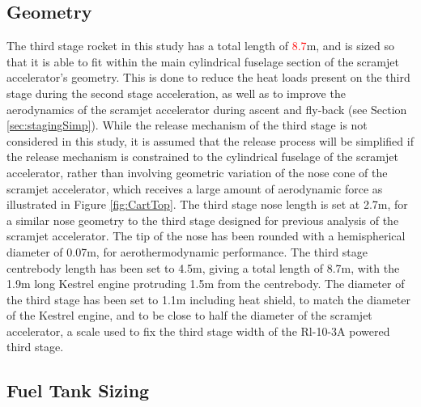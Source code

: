  \subsection{Geometry}\label{sec:3int}
The third stage rocket in this study has a total length of \textcolor{red}{8.7}m, and is sized so that it is able to fit within the main cylindrical fuselage section of the scramjet accelerator's geometry. This is done to reduce the heat loads present on the third stage during the second stage acceleration, as well as to improve the aerodynamics of the scramjet accelerator during ascent and fly-back (see Section \ref{sec:stagingSimp}). While the release mechanism of the third stage is not considered in this study, it is assumed that the release process will be simplified if the release mechanism is constrained to the cylindrical fuselage of the scramjet accelerator, rather than involving geometric variation of the nose cone of the scramjet accelerator, which receives a large amount of aerodynamic force as illustrated in Figure \ref{fig:CartTop}.
 The third stage nose length is set at 2.7m, for a similar nose geometry to the third stage designed for previous analysis of the scramjet accelerator\cite{Preller2017b}. The tip of the nose has been rounded with a hemispherical diameter of 0.07m, for aerothermodynamic performance.
 The third stage centrebody length has been set to 4.5m, giving a total length of 8.7m, with the 1.9m long Kestrel engine\cite{Vehicle2008} protruding 1.5m from the centrebody. The diameter of the third stage has been set to 1.1m including heat shield, to match the diameter of the Kestrel engine, and to be close to half the diameter of the scramjet accelerator, a scale used to fix the third stage width of the Rl-10-3A powered third stage\cite{Preller2017b}.  






	


\subsection{Fuel Tank Sizing}


